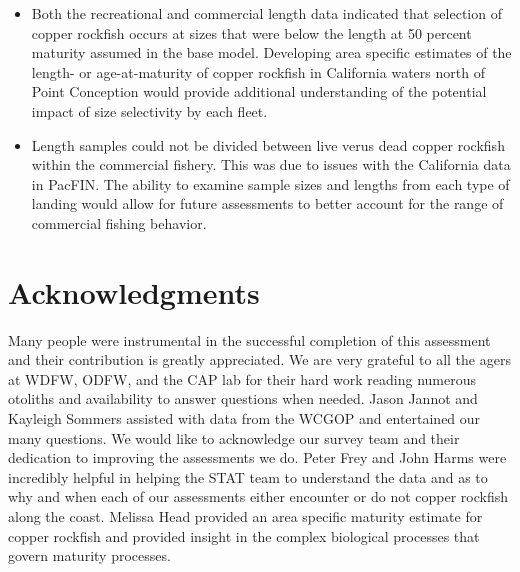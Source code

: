 \documentclass[11pt,
  english,
  a4paper,
]{article}
\begin{document}
\begin{itemize}

    \item Both the recreational and commercial length data indicated that selection of copper rockfish occurs at sizes that were below the length at 50 percent maturity assumed in the base model. Developing area specific estimates of the length- or age-at-maturity of copper rockfish in California waters north of Point Conception would provide additional understanding of the potential impact of size selectivity by each fleet.

    \item Length samples could not be divided between live verus dead copper rockfish within the commercial fishery. This was due to issues with the California data in PacFIN. The ability to examine sample sizes and lengths from each type of landing would allow for future assessments to better account for the range of commercial fishing behavior.

\end{itemize}


\hypertarget{acknowledgments}{%
\section{Acknowledgments}\label{acknowledgments}}

\leavevmode\tagmcend\tagstructend


Many people were instrumental in the successful completion of this assessment and their contribution is greatly appreciated. We are very grateful to all the agers at WDFW, ODFW, and the CAP lab for their hard work reading numerous otoliths and availability to answer questions when needed. Jason Jannot and Kayleigh Sommers assisted with data from the WCGOP and entertained our many questions. We would like to acknowledge our survey team and their dedication to improving the assessments we do. Peter Frey and John Harms were incredibly helpful in helping the STAT team to understand the data and as to why and when each of our assessments either encounter or do not copper rockfish along the coast. Melissa Head provided an area specific maturity estimate for copper rockfish and provided insight in the complex biological processes that govern maturity processes.

\leavevmode\tagmcend\tagstructend\par
\end{document}
